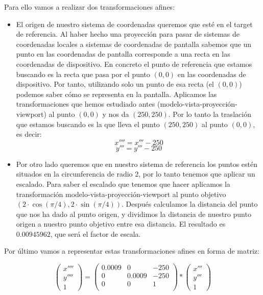 \documentclass[a4paper,11pt, oneside]{book}
\begin{document}
Para ello vamos a realizar dos transformaciones afines:
\begin{itemize}
	\item El origen de nuestro sistema de coordenadas queremos que esté en el target de referencia. Al haber hecho una proyección para pasar de sistemas de coordenadas locales a sistemas de coordenadas de pantalla sabemos que un punto en las coordenadas de pantalla corresponde a una recta en las coordenadas de dispositivo. En concreto el punto de referencia que estamos buscando es la recta que pasa por el punto $(0,0)$ en las coordenadas de dispositivo. Por tanto, utilizando solo un punto de esa recta (el $(0,0)$) podemos saber cómo se representa en la pantalla. Aplicamos las transformaciones que hemos estudiado antes (modelo-vista-proyección-viewport) al punto $(0,0)$ y nos da $(250,250)$. Por lo tanto la traslación que estamos buscando es la que lleva el punto $(250,250)$ al punto $(0,0)$, es decir:
	\begin{equation}
	x'''' = x'''-250
	\end{equation}
	\begin{equation}
	y''' = y'''-250
	\end{equation}
	\item Por otro lado queremos que en nuestro sistema de referencia los puntos estén situados en la circunferencia de radio 2, por lo tanto tenemos que aplicar un escalado. Para saber el escalado que tenemos que hacer aplicamos la transformación modelo-vista-proyección-viewport al punto objetivo $(2\cdot \cos(\pi/4),2\cdot \sin(\pi/4))$. Después calculamos la distancia del punto que nos ha dado al punto origen, y dividimos la distancia de nuestro punto origen a nuestro punto objetivo entre esa distancia. El resultado es $0.00945962$, que será el factor de escala.
\end{itemize}
Por último vamos a representar estas transformaciones afines en forma de matriz:

\begin{equation}
\begin{pmatrix}
x''''\\
y''''\\
1
\end{pmatrix} =
\begin{pmatrix}
0.0009 &0&-250\\
0&0.0009&-250\\
0&0&1 \\
\end{pmatrix}
*\begin{pmatrix}
x'''\\
y'''\\
1
\end{pmatrix}
\end{equation}
\end{document}
